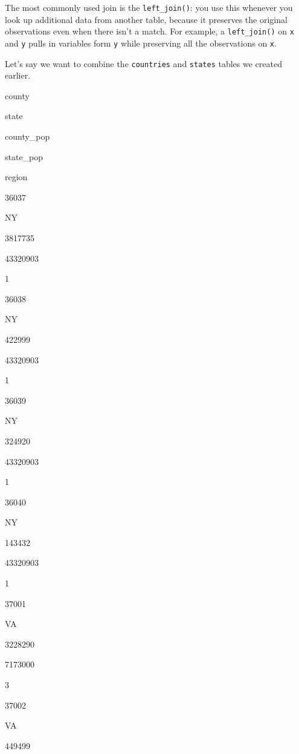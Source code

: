 \documentclass[]{book}
\newenvironment{Shaded}{\begin{snugshade}}{\end{snugshade}}
\newcommand{\KeywordTok}[1]{\textcolor[rgb]{0.13,0.29,0.53}{\textbf{#1}}}
\newcommand{\DataTypeTok}[1]{\textcolor[rgb]{0.13,0.29,0.53}{#1}}
\newcommand{\StringTok}[1]{\textcolor[rgb]{0.31,0.60,0.02}{#1}}
\newcommand{\OperatorTok}[1]{\textcolor[rgb]{0.81,0.36,0.00}{\textbf{#1}}}
\newcommand{\NormalTok}[1]{#1}
\begin{document}
The most commonly used join is the \texttt{left\_join()}: you use this
whenever you look up additional data from another table, because it
preserves the original observations even when there isn't a match. For
example, a \texttt{left\_join()} on \texttt{x} and \texttt{y} pulls in
variables form \texttt{y} while preserving all the observations on
\texttt{x}.

Let's say we want to combine the \texttt{countries} and \texttt{states}
tables we created earlier.

\begin{Shaded}
\end{Shaded}

county

state

county\_pop

state\_pop

region

36037

NY

3817735

43320903

1

36038

NY

422999

43320903

1

36039

NY

324920

43320903

1

36040

NY

143432

43320903

1

37001

VA

3228290

7173000

3

37002

VA

449499
\end{document}
